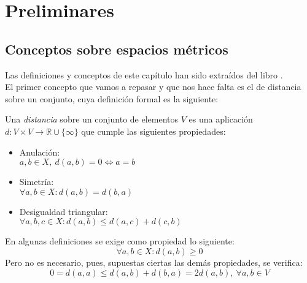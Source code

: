 
\chapter{Preliminares}\label{ch:primer-capitulo}

\section{Conceptos sobre espacios métricos}
Las definiciones y conceptos de este capítulo han sido extraídos del libro \cite{topo}. \\

El primer concepto que vamos a repasar y que nos hace falta es el de distancia sobre un conjunto, cuya definición formal es la siguiente:

\begin{definicion}
	Una \textit{distancia} sobre un conjunto de elementos $V$ es una aplicación $d:V\times V\rightarrow \mathbb{R}\cup \{\infty\}$ que cumple las siguientes propiedades:
	\begin{itemize}
		\item Anulación:
		\\ \hspace*{1cm}$a,b \in X,\ d(a,b)=0\Leftrightarrow a=b$
		\item Simetría:
		\\ \hspace*{1cm}$\forall a,b \in X: d(a,b)=d(b,a)$
		\item Desigualdad triangular:
		\\ \hspace*{1cm}$\forall a,b,c \in X: d(a,b)\leq d(a,c)+d(c,b)$
	\end{itemize}
\end{definicion}

En algunas definiciones se exige como propiedad lo siguiente:
$$\forall a,b\in X:d(a,b) \geq 0$$
Pero no es necesario, pues, supuestas ciertas las demás propiedades, se verifica:
$$0=d(a,a)\leq d(a,b) + d(b,a) = 2d(a,b),\ \forall a,b\in V$$

